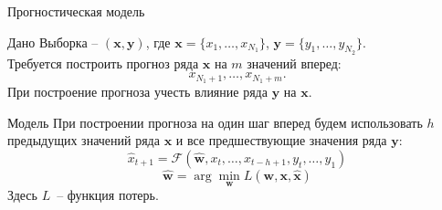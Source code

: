 \documentclass[9pt]{beamer}
\newcommand{\bx}{\mathbf{x}}
\newcommand{\by}{\mathbf{y}}
\newcommand{\bw}{\mathbf{w}}
\begin{document}
\begin{frame}{Прогностическая модель}
	\begin{block}{Дано}
	\vspace{0.1cm}
	Выборка -- $\left( \bx, \by \right)$,\; где \quad
	$\bx = \{ x_1,\dots, x_{N_1}\}$,\quad
	$\by = \{ y_1,\dots, y_{N_2}\}$.\\
	\vspace{0.3cm}
	Требуется построить прогноз ряда $\bx$ на $m$ значений вперед:   \[x_{N_1 + 1},\dots, x_{N_1 + m}.\]
	При построение прогноза учесть влияние ряда $\by$ на $\bx$.
	\end{block}
\vspace{0.3cm}
\begin{block}{Модель}
    \vspace{0.1cm}
	При построении прогноза на один шаг вперед будем использовать $h$ предыдущих значений ряда $\bx$ и все предшествующие значения ряда $\by$:
	\[
		\hat{x}_{t+1} = \mathcal{F}(\hat{\bw}, x_t,\dots,x_{t-h+1}, y_t,\dots,y_1)
	\]
	\[
	    \hat{\bw} = \arg\min_{\bw} L(\bw, \bx, \hat{\bx})
	\]
	Здесь $L$~-- функция потерь.
	
\end{block}
	
\end{frame}
\end{document}

